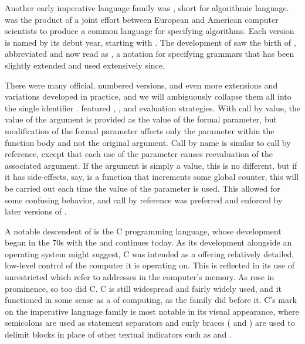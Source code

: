 Another early imperative language family was \vocab{\Algol}{}, short for algorithmic language. \Algol was the product of a joint effort between European and American computer scientists to produce a common language for specifying algorithms. Each version is named by its debut year, starting with \Algol[ 58]{}. The development of \Algol saw the birth of , abbreviated  and now read as , a notation for specifying grammars that has been slightly extended and used extensively since.

There were many official, numbered \Algol versions, and even more extensions and variations developed in practice, and we will ambiguously collapse them all into the single identifier \Algol{}. \Algol featured , , and  evaluation strategies. With call by value, the value of the argument is provided as the value of the formal parameter, but modification of the formal parameter affects only the parameter within the function body and not the original argument. Call by name is similar to call by reference, except that each use of the parameter causes reevaluation of the associated argument. If the argument is simply a value, this is no different, but if it has side-effects, say, is a function that increments some global counter, this will be carried out each time the value of the parameter is used. This allowed for some confusing behavior, and call by reference was preferred and enforced by later versions of \Algol{}.

A notable descendent of \Algol is the C programming language, whose development began in the 70s with the  and continues today. As its development alongside an operating system might suggest, C was intended as a  offering relatively detailed, low-level control of the computer it is operating on. This is reflected in its use of unrestricted  which refer to addresses in the computer's memory. As \Unix rose in prominence, so too did C. C is still widespread and fairly widely used, and it functioned in some sense as a  of computing, as the \Algol family did before it. C's mark on the imperative language family is most notable in its visual appearance, where semicolons are used as statement separators and curly braces (\code{\{} and \code{\}}) are used to delimit blocks in place of other textual indicators such as  and .

